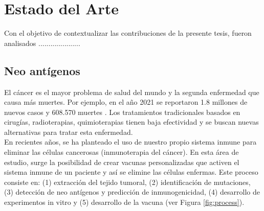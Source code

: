 \chapter{Estado del Arte}
\label{cap:estadodelarte}

Con el objetivo de contextualizar las contribuciones de la presente tesis, fueron
analisados ..................... 

\section{Neo antígenos}\index{} 
\label{sec:neoantigen}



El cáncer es el mayor problema de salud del mundo y la segunda enfermedad que causa más muertes. Por ejemplo, en el año 2021 se reportaron 1.8 millones de nuevos casos y 608.570 muertes \citep{siegel2022cancer}. Los tratamientos tradicionales basados en cirugías, radioterapias, quimioterapias tienen baja efectividad \citep{peng2019neoantigen} y se buscan nuevas alternativas para tratar esta enfermedad. \\

En recientes años, se ha planteado el uso de nuestro propio sistema inmune para eliminar las células cancerosas (inmunoterapia del cáncer). En esta área de estudio, surge la posibilidad de crear vacunas personalizadas que activen el sistema inmune de un paciente y así se elimine las células enfermas. Este proceso consiste en: (1) extracción del tejido tumoral, (2) identificación de mutaciones, (3) detección de neo antígenos y predicción de inmunogenicidad, (4) desarrollo de experimentos in vitro y (5) desarrollo de la vacuna \citep{de2020neoantigen, peng2019neoantigen} (ver Figura \ref{fig:process}). \\

